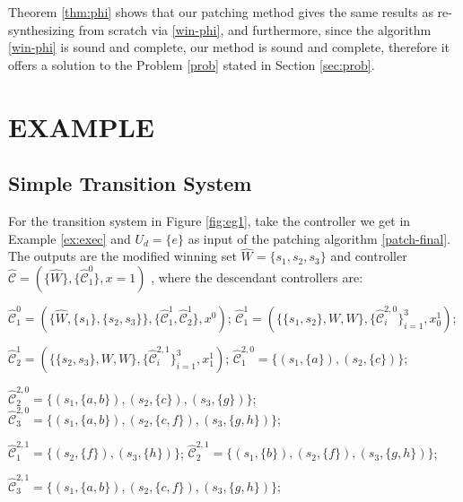 Theorem \ref{thm:phi} shows that our patching method gives the same results as re-synthesizing from scratch via \eqref{win-phi}, and furthermore, since the algorithm \eqref{win-phi} is sound and complete, our method is sound and complete, therefore it offers a solution to the Problem \ref{prob} stated in Section \ref{sec:prob}.

\section{EXAMPLE}
\label{sec:example}
\subsection{Simple Transition System}
\label{sec:example1}
For the transition system in Figure \ref{fig:eg1}, take the controller we get in Example \ref{ex:exec} and  $ U_d= \{e\} $ as input of the patching algorithm \eqref{patch-final}. The outputs are the modified winning set $ \widehat{W}=\{s_1,s_2,s_3\} $ and controller $ \widehat{\mathcal{C}} = (\{\widehat{W}\},\{\widehat{\mathcal{C}}_1^0\},x=1) $ , where the {\color{teal}descendant} controllers are: 

\noindent$ \widehat{\mathcal{C}}^0_1 = (\{\widehat{W},\{s_1\},\{s_2,s_3\}\},\{\widehat{\mathcal{C}}^1_1, \widehat{\mathcal{C}}^1_2\},x^0) $; $ \widehat{\mathcal{C}}^1_1 = (\{\{s_1,s_2\},W,W\},\{\widehat{\mathcal{C}}^{2,0}_i\}_{i=1}^3, x^1_0)$; 

\noindent$ \widehat{\mathcal{C}}^1_2 = (\{\{s_2,s_3\},W,W\},\{\widehat{\mathcal{C}}^{2,1}_i\}_{i=1}^{3}, x^1_1)$; $ \widehat{\mathcal{C}}^{2,0}_1 = \{(s_1,\{a\}),(s_2,\{c\})\} $;

\noindent$ \widehat{\mathcal{C}}^{2,0}_2 = \{(s_1,\{a,b\}),(s_2,\{c\}),(s_3,\{g\})\} $; $ \widehat{\mathcal{C}}^{2,0}_3 = \{(s_1,\{a,b\}),(s_2,\{c,f\}),(s_3,\{g,h\})\} $; 

\noindent$ \widehat{\mathcal{C}}^{2,1}_1 = \{(s_2,\{f\}),(s_3,\{h\})\} $; $ \widehat{\mathcal{C}}^{2,1}_2 = \{(s_1,\{b\}),(s_2,\{f\}), (s_3,\{g,h\})\} $;

\noindent$ \widehat{\mathcal{C}}^{2,1}_3 = \{(s_1,\{a,b\}),(s_2,\{c,f\}),(s_3,\{g,h\})\} $;


